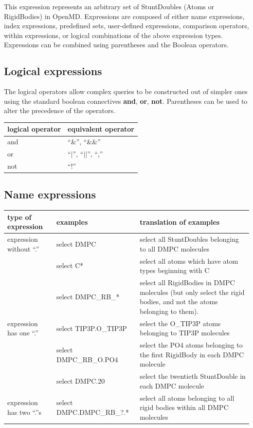 \documentclass[]{book}
\begin{document}
This expression represents an arbitrary set of StuntDoubles (Atoms or
RigidBodies) in {\sc OpenMD}. Expressions are composed of either name
expressions, index expressions, predefined sets, user-defined
expressions, comparison operators, within expressions, or logical
combinations of the above expression types. Expressions can be
combined using parentheses and the Boolean operators.

\subsection{\label{section:logical}Logical expressions}

The logical operators allow complex queries to be constructed out of
simpler ones using the standard boolean connectives {\bf and}, {\bf
or}, {\bf not}. Parentheses can be used to alter the precedence of the
operators.

\begin{center}
\begin{tabular}{|ll|}
\hline
{\bf logical operator} & {\bf equivalent operator}  \\  
\hline
and & ``\&'', ``\&\&'' \\
or & ``$|$'', ``$||$'', ``,'' \\
not & ``!''  \\
\hline
\end{tabular}
\end{center}

\subsection{\label{section:name}Name expressions}

\begin{center}
\begin{tabular}{|llp{3in}|}
\hline
{\bf type of expression} & {\bf examples} & {\bf translation of
examples} \\
\hline
expression without ``.'' & select DMPC & select all StuntDoubles
belonging to all DMPC molecules \\
 & select C* & select all atoms which have atom types beginning with C
\\
 & select DMPC\_RB\_* & select all RigidBodies in DMPC molecules (but
only select the rigid bodies, and not the atoms belonging to them). \\
\hline
expression has one ``.'' & select TIP3P.O\_TIP3P & select the O\_TIP3P
atoms belonging to TIP3P molecules \\
 & select DMPC\_RB\_O.PO4 & select the PO4 atoms belonging to
the first 
RigidBody in each DMPC molecule \\
 & select DMPC.20 & select the twentieth StuntDouble in each DMPC
molecule \\
\hline
expression has two ``.''s & select DMPC.DMPC\_RB\_?.* &
select all atoms 
belonging to all rigid bodies within all DMPC molecules \\
\hline
\end{tabular}
\end{center}
\end{document}

